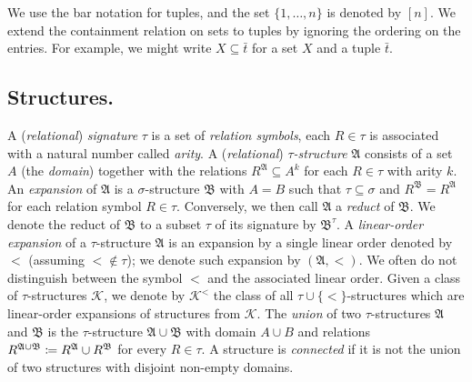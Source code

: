 \documentclass[oneside,reqno,12pt]{amsart}
\theoremstyle{plain}
\theoremstyle{remark}
\renewcommand{\coloneqq}{\mathrel{\mathop:}\mathrel{\mkern-1.2mu}=}
\newcommand{\struct}[1]{\mathfrak{#1}}
\begin{document}
{We use the bar notation for tuples, and the set $\{1,\dots,n\}$ is denoted by $[n]$.
We extend the containment relation on sets to tuples by ignoring the ordering on the entries. For example, we might write $X\subseteq \bar{t}$ for a set $X$ and a tuple $\bar{t}$. 



\subsection{Structures.} 
A (\emph{relational}) \emph{signature} $\tau$ is a set of \emph{relation symbols}, each $R\in\tau$ is associated with a natural number called \emph{arity}.
A (\emph{relational}) \emph{$\tau$-structure} $\struct{A}$ consists of a set $A$ (the \emph{domain}) together with the relations $R^{\struct{A}}\subseteq A^{k}$ for each $R\in \tau$ with arity $k$.
An \emph{expansion} of $\struct{A}$ is a $\sigma$-structure $ \struct{B}$ with $A=B$ such that $ \tau\subseteq \sigma$ and $R^{\struct{B}}=R^{\struct{A}}$ for each relation symbol $R\in \tau$. Conversely, we then  call $\struct{A}$ a \emph{reduct} of $\struct{B}$.
We denote the reduct of $\struct{B}$ to a subset $\tau$ of its signature by $\struct{B}^{\tau}$.
A \emph{linear-order expansion} of a $\tau$-structure $\struct{A}$ is an expansion by a single linear order denoted by $<$ (assuming  ${<}\notin \tau$); we denote such expansion by $(\struct{A},<)$.
We often do not distinguish between the symbol $<$ and the associated linear order. 
Given a class of $\tau$-structures $\mathcal{K}$, we denote by $\mathcal{K}^{<}$ the class of all $\tau\cup \{<\}$-structures which are linear-order expansions of structures from $\mathcal{K}$.
The \emph{union} of two $\tau$-structures $\struct{A}$ and $\struct{B}$ is the $\tau$-structure $\struct{A}\cup \struct{B}$ with domain $A\cup B$ and relations $R^{\struct{A}\cup \struct{B}}\coloneqq R^{\struct{A}}\cup R^{\struct{B}}$ for every $R\in \tau$.
A structure is \emph{connected} if it is not the union of two structures with disjoint non-empty domains.

 

}
\end{document}
